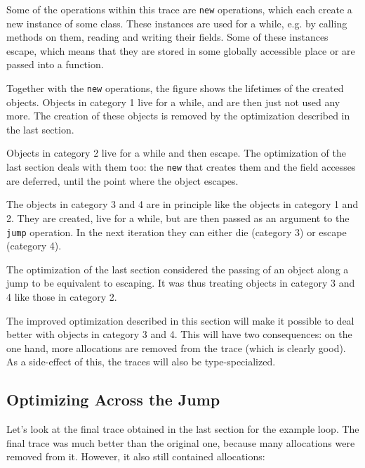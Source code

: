 \documentclass{sigplanconf}
\begin{document}
Some of the operations within this trace are \texttt{new} operations, which each create a
new instance of some class. These instances are used for a while, e.g. by
calling methods on them, reading and writing their fields. Some of these
instances escape, which means that they are stored in some globally accessible
place or are passed into a function.

Together with the \texttt{new} operations, the figure shows the lifetimes of the
created objects. Objects in category 1 live for a while, and are then just not
used any more. The creation of these objects is removed by the
optimization described in the last section.

Objects in category 2 live for a while and then escape. The optimization of the
last section deals with them too: the \texttt{new} that creates them and
the field accesses are deferred, until the point where the object escapes.

The objects in category 3 and 4 are in principle like the objects in category 1
and 2. They are created, live for a while, but are then passed as an argument
to the \texttt{jump} operation. In the next iteration they can either die (category
3) or escape (category 4).

The optimization of the last section considered the passing of an object along a
jump to be equivalent to escaping. It was thus treating objects in category 3
and 4 like those in category 2.

The improved optimization described in this section will make it possible to deal
better with objects in category 3 and 4. This will have two consequences: on
the one hand, more allocations are removed from the trace (which is clearly
good). As a side-effect of this, the traces will also be type-specialized.



\subsection{Optimizing Across the Jump}

Let's look at the final trace obtained in the last section for the example loop.
The final trace was much better than the original one, because many allocations
were removed from it. However, it also still contained allocations:
\end{document}
